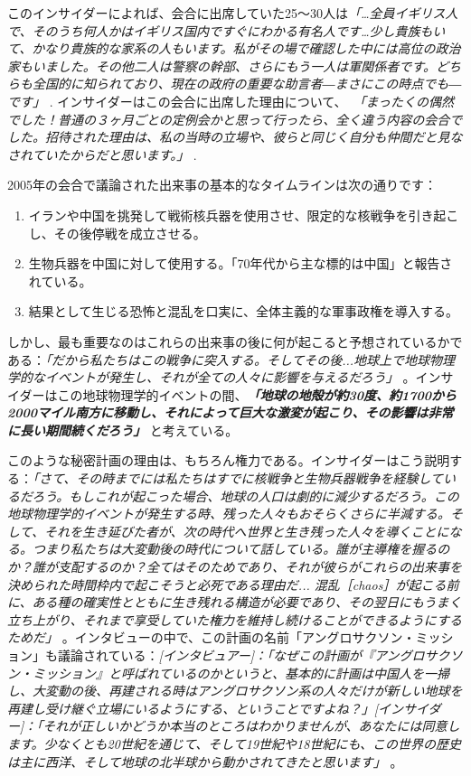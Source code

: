 \documentclass[10pt,twocolumn,letterpaper]{article}
\begin{document}
このインサイダーによれば、会合に出席していた25～30人は\textit{「…全員イギリス人で、そのうち何人かはイギリス国内ですぐにわかる有名人です…少し貴族もいて、かなり貴族的な家系の人もいます。私がその場で確認した中には高位の政治家もいました。その他二人は警察の幹部、さらにもう一人は軍関係者です。どちらも全国的に知られており、現在の政府の重要な助言者―まさにこの時点でも―です」} \cite{4}. インサイダーはこの会合に出席した理由について、\ \textit{「まったくの偶然でした！普通の３ヶ月ごとの定例会かと思って行ったら、全く違う内容の会合でした。招待された理由は、私の当時の立場や、彼らと同じく自分も仲間だと見なされていたからだと思います。」} \cite{4}.

2005年の会合で議論された出来事の基本的なタイムラインは次の通りです：
\begin{flushleft}
\begin{enumerate}
    \item イランや中国を挑発して戦術核兵器を使用させ、限定的な核戦争を引き起こし、その後停戦を成立させる。
    \item 生物兵器を中国に対して使用する。「70年代から主な標的は中国」と報告されている。
    \item 結果として生じる恐怖と混乱を口実に、全体主義的な軍事政権を導入する。
\end{enumerate}
\end{flushleft}

しかし、最も重要なのはこれらの出来事の後に何が起こると予想されているかである：\textit{「だから私たちはこの戦争に突入する。そしてその後...地球上で地球物理学的なイベントが発生し、それが全ての人々に影響を与えるだろう」} \cite{4}。インサイダーはこの地球物理学的イベントの間、\textit{\textbf{「地球の地殻が約30度、約1700から2000マイル南方に移動し、それによって巨大な激変が起こり、その影響は非常に長い期間続くだろう」}} \cite{4}と考えている。

このような秘密計画の理由は、もちろん権力である。インサイダーはこう説明する：\textit{「さて、その時までには私たちはすでに核戦争と生物兵器戦争を経験しているだろう。もしこれが起こった場合、地球の人口は劇的に減少するだろう。この地球物理学的イベントが発生する時、残った人々もおそらくさらに半減する。そして、それを生き延びた者が、次の時代へ世界と生き残った人々を導くことになる。つまり私たちは大変動後の時代について話している。誰が主導権を握るのか？誰が支配するのか？全てはそのためであり、それが彼らがこれらの出来事を決められた時間枠内で起こそうと必死である理由だ... 混乱［chaos］が起こる前に、ある種の確実性とともに生き残れる構造が必要であり、その翌日にもうまく立ち上がり、それまで享受していた権力を維持し続けることができるようにするためだ」} \cite{4}。インタビューの中で、この計画の名前「アングロサクソン・ミッション」も議論されている：\textit{[インタビュアー]：「なぜこの計画が『アングロサクソン・ミッション』と呼ばれているのかというと、基本的に計画は中国人を一掃し、大変動の後、再建される時はアングロサクソン系の人々だけが新しい地球を再建し受け継ぐ立場にいるようにする、ということですよね？」[インサイダー]：「それが正しいかどうか本当のところはわかりませんが、あなたには同意します。少なくとも20世紀を通じて、そして19世紀や18世紀にも、この世界の歴史は主に西洋、そして地球の北半球から動かされてきたと思います」} \cite{4}。
\end{document}
